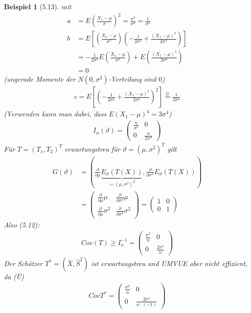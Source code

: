\documentclass[a4paper,openany]{book}
\theoremstyle{mytheoremstyle}
\newtheorem*{bei}{Beispiel}
\theoremstyle{mytheoremstyle2}
\begin{document}
\begin{bei}[5.13]
  mit 
  \begin{align*}
    a&= E \left(\frac{X_1-\mu }{\sigma }\right)^2=\frac{\sigma ^2}{\sigma ^4}=\frac{1}{\sigma ^2} \\
    b&=E \left[\left(\frac{X_1-\mu }{\sigma ^2}\right)\left(-\frac{1}{2 \sigma ^2}+\frac{(X_1-\mu )^2}{2 \sigma ^4}\right)\right]\\
     &=-\frac{1}{2 \sigma ^2}E \left(\frac{X_1-\mu }{\sigma ^2}\right)+E \left(\frac{(X_1-\mu )^3}{2 \sigma ^6}\right)\\
     &=0
  \end{align*}
  (ungerade Momente der $N(0,\sigma ^2)$-Verteilung sind $0$)
  \begin{align*}
    c=E \left[\left(-\frac{1}{2 \sigma ^2}+\frac{(X_1-\mu )^2}{2 \sigma ^4}\right)^2\right]\overset{\text{Ü}}=\frac{1}{2 \sigma ^4}
  \end{align*}
  (Verwenden kann man dabei, dass $E(X_1-\mu)^4=3 \sigma ^4$)
  \begin{align*}
    I_n(\vartheta )=\begin{pmatrix}
      \frac{n}{\sigma ^2}&0\\0&\frac{n}{2\sigma ^4}
    \end{pmatrix}
  \end{align*}
  Für $T=(T_1,T_2)^T$ erwartungstreu für $\vartheta =(\mu ,\sigma ^2)^T$ gilt 
  \begin{align*}
    G(\vartheta )
    &=\left(\frac{\partial }{\partial \mu }\underbrace{E _{\vartheta }(T(X))}_{=(\mu ,\sigma ^2)^T},\frac{\partial }{\partial \sigma ^2}E _{\vartheta }(T(X))\right) \\
    &=\begin{pmatrix}
      \frac{\partial }{\partial \mu }\mu &\frac{\partial }{\partial \sigma ^2}\mu \\\frac{\partial }{\partial \mu }\sigma ^2&\frac{\partial }{\partial \sigma ^2}\sigma ^2
    \end{pmatrix}=\begin{pmatrix}1&0\\0&1\end{pmatrix}
  \end{align*}
  Also (5.12): 
  \begin{align*}
    Cov(T)\geq I_n ^{-1}=\begin{pmatrix}
      \frac{\sigma ^2}{n}&0\\0&\frac{2 \sigma ^4}{n}
    \end{pmatrix}
  \end{align*}
  Der Schätzer $T^*=(\bar{X},\hat{S}^2)$ ist erwartungstreu und UMVUE aber nicht effizient, da (Ü)
  \begin{align*}
    Cov T^*=\begin{pmatrix}
      \frac{\sigma ^2}{n}&0\\0&\frac{2 \sigma ^4}{n \cdot (-1)}
    \end{pmatrix}
  \end{align*}
\end{bei}
\end{document}
